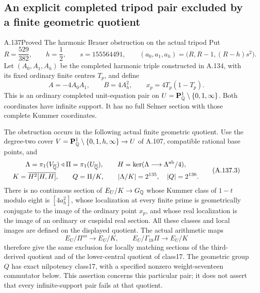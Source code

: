 \subsection{An explicit completed tripod pair excluded by a finite geometric quotient}

\begin{statement}{A.137}{Proved}
{The harmonic Brauer obstruction on the actual tripod}
Put
\[
 R=\frac{529}{382},\qquad h=\frac12,\qquad
 s=155564491,
 \qquad (a_0,a_1,a_h)=\bigl(R,R-1,(R-h)s^2\bigr).
\tag{A.137.1}
\]
Let \((A_0,A_1,A_h)\) be the completed harmonic triple
constructed in A.134, with its fixed ordinary finite
centres \(T_p\), and define
\[
 A=-4A_0A_1,\qquad B=4A_h^2,\qquad
 x_p=4T_p(1-T_p).
\tag{A.137.2}
\]
This is an ordinary completed unit-equation pair on
\(U=\mathbf P^1_\mathbb Q\setminus\{0,1,\infty\}\).
Both coordinates have infinite support.  It has no
full Selmer section with those complete Kummer coordinates.

The obstruction occurs in the following actual finite
geometric quotient.  Use the degree-two cover
\(V=\mathbf P^1_\mathbb Q\setminus\{0,1,h,\infty\}\to U\)
of A.107, compatible rational base points, and
\[
 \begin{gathered}
 \Lambda=\pi_1(V_{\overline{\mathbb Q}})\triangleleft
       \Pi=\pi_1(U_{\overline{\mathbb Q}}),\qquad
 H=\ker(\Lambda\longrightarrow\Lambda^{\rm ab}/4),\\
 K=\overline{H^2[H,H]},\qquad Q=\Pi/K,\qquad
 |\Lambda/K|=2^{135},\quad |Q|=2^{136}.
 \end{gathered}
\tag{A.137.3}
\]
There is no continuous section of \(E_U/K\to G_\mathbb Q\)
whose Kummer class of \(1-t\) modulo eight is
\([4a_h^2]\), whose localization at every finite prime
is geometrically conjugate to the image of the ordinary
point \(x_p\), and whose real localization is the image
of an ordinary or cuspidal real section.
All these classes and local images are defined on the
displayed quotient.
The actual arithmetic maps
\[
 E_U/\Pi'''\longrightarrow E_U/K,\qquad
 E_U/\Gamma_{18}\Pi\longrightarrow E_U/K
\tag{A.137.4}
\]
therefore give the same exclusion for locally matching
sections of the third-derived quotient and of the
lower-central quotient of class17.  The geometric group
$Q$ has exact nilpotency class17, with a specified
nonzero weight-seventeen commutator below.
This assertion concerns this particular pair; it does
not assert that every infinite-support pair fails at
that quotient.
\end{statement}

